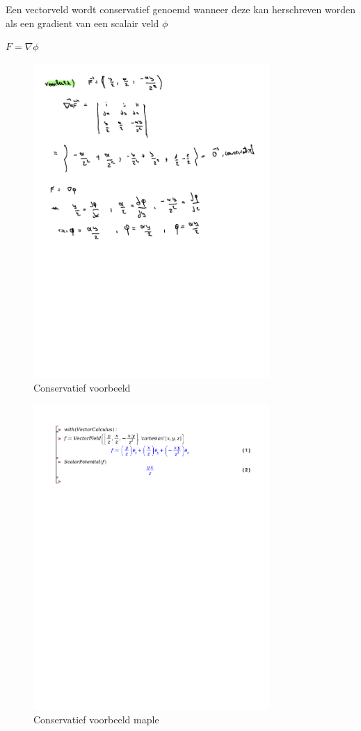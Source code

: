 \documentclass[a4paper]{report}
\begin{document}
Een vectorveld wordt conservatief genoemd wanneer deze kan herschreven worden als een gradient van een scalair veld $\phi$

$F = \nabla \phi$

\begin{figure}[H]
	\centering
	\includegraphics[width=0.8\textwidth]{assets/scalar_potential.pdf}
	\caption{Conservatief voorbeeld}
\end{figure}

\begin{figure}[H]
	\centering
	\includegraphics[width=0.8\textwidth]{exercises/voorbeeld_week_4_conservatief.pdf}
	\caption{Conservatief voorbeeld maple}
\end{figure}
\end{document}
